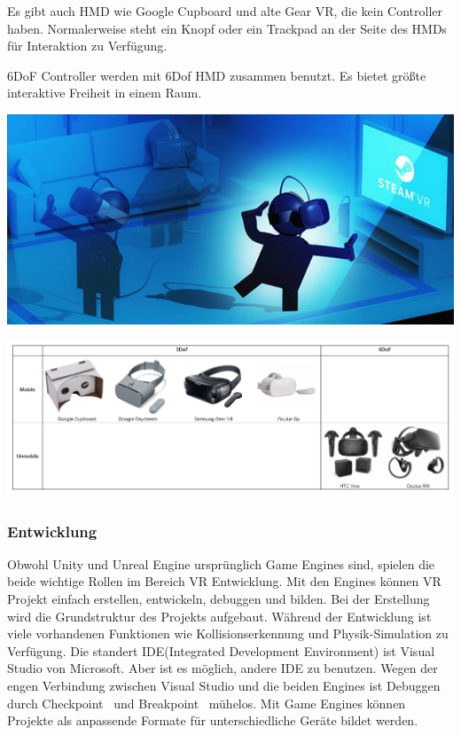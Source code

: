   Es gibt auch HMD wie Google Cupboard und alte Gear VR, die kein Controller haben. Normalerweise steht ein Knopf oder ein Trackpad an der Seite des HMDs für Interaktion zu Verfügung.
  
  6DoF Controller werden mit 6Dof HMD zusammen benutzt. Es bietet größte interaktive Freiheit in einem Raum. 
  
\includegraphics[width=\textwidth]{images/6dcontroller.jpg}

\includegraphics[width=\textwidth]{images/vrDevicesTable.png}
  
  \subsubsection{Entwicklung}
  Obwohl Unity und Unreal Engine ursprünglich Game Engines sind, spielen die beide wichtige Rollen im Bereich VR Entwicklung. Mit den Engines können VR Projekt einfach erstellen, entwickeln, debuggen und bilden. Bei der Erstellung wird die Grundstruktur des Projekts aufgebaut. Während der Entwicklung ist viele vorhandenen Funktionen wie Kollisionserkennung und Physik-Simulation zu Verfügung. Die standert IDE(Integrated Development Environment) ist Visual Studio von Microsoft. Aber ist es möglich, andere IDE zu benutzen. Wegen der engen Verbindung zwischen Visual Studio und die beiden Engines ist Debuggen durch \glqq Checkpoint \grqq\ und \glqq Breakpoint \grqq\ mühelos. Mit Game Engines können Projekte als anpassende Formate für unterschiedliche Geräte bildet werden.

